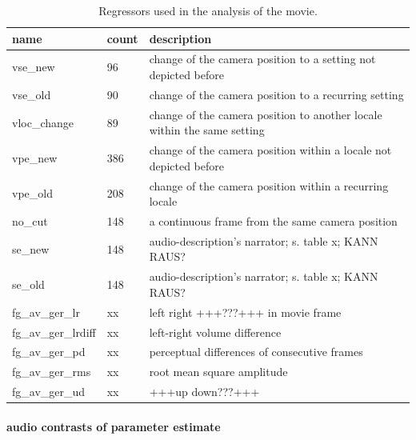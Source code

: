 \documentclass[english]{article}
\begin{document}
\begin{table}
\caption{Regressors used in the analysis of the movie.}
\begin{tabular}{lll}
\toprule
\textbf{name} & \textbf{count} & \textbf{description} \\
\midrule
vse\_new & 96 & change of the camera position to a setting not depicted before \\
vse\_old & 90 & change of the camera position to a recurring setting \\
vloc\_change & 89 & change of the camera position to another locale within the same setting \\
vpe\_new & 386 & change of the camera position within a locale not depicted before \\
vpe\_old & 208 & change of the camera position within a recurring locale \\
no\_cut & 148 & a continuous frame from the same camera position \\
se\_new & 148 & audio-description's narrator; s. table x; KANN RAUS? \\
se\_old & 148 & audio-description's narrator; s. table x; KANN RAUS? \\
fg\_av\_ger\_lr & xx & left right +++???+++ in movie frame  \\
fg\_av\_ger\_lrdiff & xx & left-right volume difference \\
fg\_av\_ger\_pd & xx & perceptual differences of consecutive frames \\
fg\_av\_ger\_rms & xx & root mean square amplitude \\
fg\_av\_ger\_ud & xx & +++up down???+++ \\
\bottomrule
\end{tabular}
\end{table}

\paragraph{audio contrasts of parameter estimate}
\end{document}
